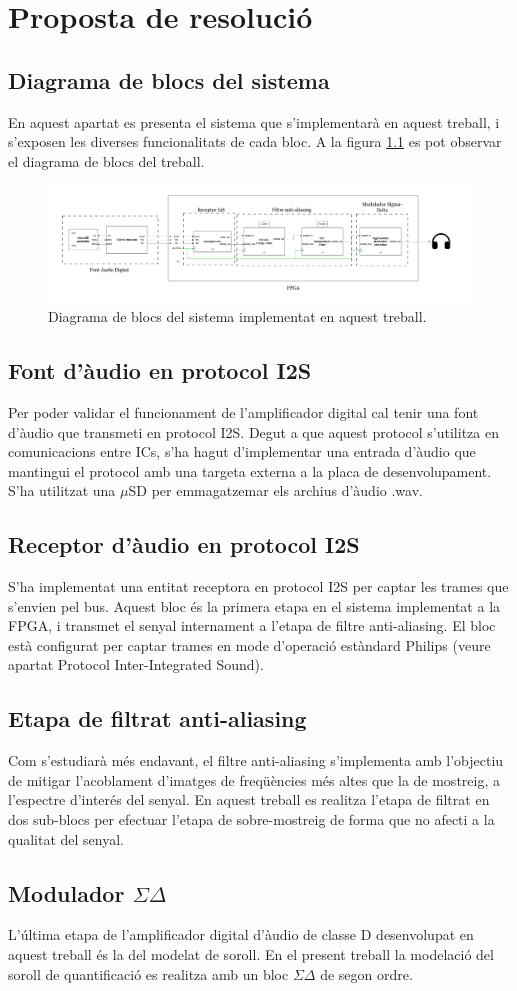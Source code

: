 \chapter{Proposta de resolució}
\section{Diagrama de blocs del sistema}
\par En aquest apartat es presenta el sistema que s'implementarà en aquest treball, i s'exposen les diverses funcionalitats de cada bloc. A la figura \ref{figTFGDiagr} es pot observar el diagrama de blocs del treball.

\begin{figure}
    \centering
    \includegraphics[angle=90,origin=c, width=0.4\linewidth]{Images/EstatActualTFG.drawio.png}
    \caption{Diagrama de blocs del sistema implementat en aquest treball.}
    \label{figTFGDiagr}
\end{figure}

\section{Font d'àudio en protocol I2S}
\par Per poder validar el funcionament de l'amplificador digital cal tenir una font d'àudio que transmeti en protocol I2S. Degut a que aquest protocol s'utilitza en comunicacions entre ICs, s'ha hagut d'implementar una entrada d'àudio que mantingui el protocol amb una targeta externa a la placa de desenvolupament. S'ha utilitzat una $\mu$SD per emmagatzemar els archius d'àudio .wav.

\section{Receptor d'àudio en protocol I2S}
\par S'ha implementat una entitat receptora en protocol I2S per captar les trames que s'envien pel bus. Aquest bloc és la primera etapa en el sistema implementat a la FPGA, i transmet el senyal internament a l'etapa de filtre anti-aliasing. El bloc està configurat per captar trames en mode d'operació estàndard Philips (veure apartat Protocol Inter-Integrated Sound).

\section{Etapa de filtrat anti-aliasing}
\par Com s'estudiarà més endavant, el filtre anti-aliasing s'implementa amb l'objectiu de mitigar l'acoblament d'imatges de freqüències més altes que la de mostreig, a l'espectre d'interés del senyal. En aquest treball es realitza l'etapa de filtrat en dos sub-blocs per efectuar l'etapa de sobre-mostreig de forma que no afecti a la qualitat del senyal.

\section{Modulador $\Sigma\Delta$}
\par L'última etapa de l'amplificador digital d'àudio de classe D desenvolupat en aquest treball és la del modelat de soroll. En el present treball la modelació del soroll de quantificació es realitza amb un bloc $\Sigma\Delta$ de segon ordre. 